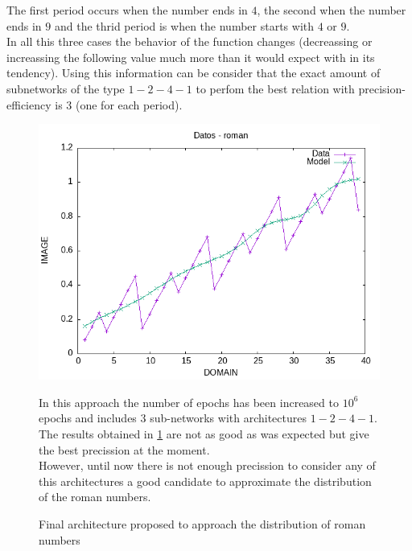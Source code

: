 \documentclass[a4paper, 11pt]{article}
\begin{document}
The first period occurs when the number ends in $4$, the second when the number ends in $9$ and the thrid period is when the number starts with $4$ or $9$.\\
In all this three cases the behavior of the function changes (decreassing or increassing the following value much more than it would expect with in its tendency). Using this information can be consider that the exact amount of subnetworks of the type $1-2-4-1$ to perfom the best relation with precision-efficiency is $3$ (one for each period).  
\begin{figure}[h]
    \begin{minipage}{5.5cm}
        \begin{center}
            \includegraphics[width = 1 \linewidth]{img/roman/roman_over_kill.png}
            \caption{Final architecture proposed to approach the distribution of roman numbers}
            \label{overkill-approach}
        \end{center}
    \end{minipage} \hspace{1em}
    \begin{minipage}{9cm}
        In this approach the number of epochs has been increased to $10^6$ epochs and includes $3$ sub-networks with architectures $1-2-4-1$.\\
        The results obtained in \ref{overkill-approach} are not as good as was expected but give the best precission at the moment.\\
        However, until now there is not enough precission to consider any of this architectures a good candidate to approximate the distribution of the roman numbers.\\
    \end{minipage}
\end{figure}\\
\end{document}
